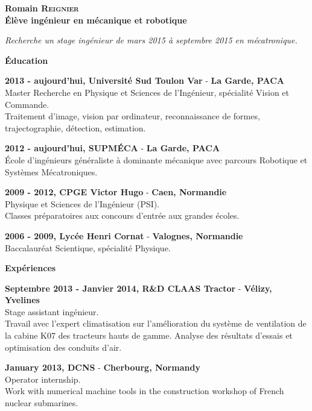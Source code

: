 \documentclass[a4paper,11pt,final]{memoir}
\newcommand{\Sep}{\vspace{1.5em}}
\newcommand{\SmallSep}{\vspace{0.5em}}
\newenvironment{AboutMe}
	{\ignorespaces%
}
	{\Sep\ignorespacesafterend}
\newcommand{\CVSection}[1]
	{\Large\textbf{#1}\par
	\SmallSep\normalsize\normalfont}
\newcommand{\CVItem}[1]
	{\textbf{\color{RoyalBlue} #1}\normalsize\normalfont}
\newcommand{\city}[1]
	{{\small\textbf{#1}}\normalsize\normalfont}
\begin{document}
\Huge\bfseries {\color{RoyalBlue} Romain \textsc{Reignier}} \\
\Large\bfseries  Élève ingénieur en mécanique et robotique\\

\normalsize\normalfont

\begin{AboutMe}
\emph{Recherche un stage ingénieur de mars 2015 à septembre 2015 en mécatronique.}
\end{AboutMe}

\CVSection{Éducation}

\CVItem{2013 - aujourd'hui, Université Sud Toulon Var} - \city{La Garde, PACA}\\
Master Recherche en Physique et Sciences de l'Ingénieur, spécialité Vision et Commande.\\
Traitement d'image, vision par ordinateur, reconnaissance de formes, trajectographie, détection, estimation.\\
\SmallSep

\CVItem{2012 - aujourd'hui, SUPMÉCA} - \city{La Garde, PACA}\\
École d'ingénieurs généraliste à dominante mécanique avec parcours Robotique et Systèmes Mécatroniques.
\SmallSep

\CVItem{2009 - 2012, CPGE Victor Hugo} - \city{Caen, Normandie}\\
Physique et Sciences de l'Ingénieur (PSI).\\
Classes préparatoires aux concours d'entrée aux grandes écoles.
\SmallSep

\CVItem{2006 - 2009, Lycée Henri Cornat} - \city{Valognes, Normandie}\\
Baccalauréat Scientique, spécialité Physique.
\Sep

\CVSection{Expériences}
\CVItem{Septembre 2013 - Janvier 2014, R\&D CLAAS Tractor} - \city{Vélizy, Yvelines}\\
Stage assistant ingénieur.\\
Travail avec l'expert climatisation sur l'amélioration du système de ventilation de la cabine K07 des tracteurs hauts de gamme.
Analyse des résultats d'essais et optimisation des conduits d'air.
\SmallSep

\CVItem{January 2013, DCNS} - \city{Cherbourg, Normandy}\\
Operator internship.\\
Work with numerical machine tools in the construction workshop of French nuclear
submarines.
\SmallSep
\end{document}
